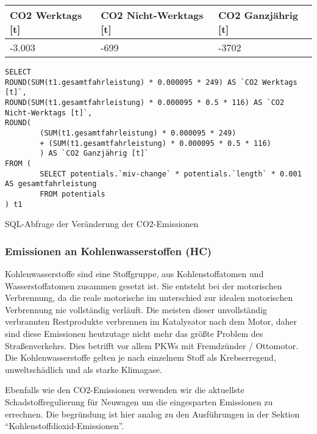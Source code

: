 \documentclass[fontsize=12pt,a4paper]{scrreprt}
\begin{document}
\vspace{1em}

\begin{tabular}{|l|l|l|}
        \hline
        CO2 Werktags [t] & CO2 Nicht-Werktags [t] & CO2 Ganzjährig [t] \\
        \hline
        -3.003           & -699                   & -3702              \\
        \hline
\end{tabular}

\begin{listing}[htbp]
        \begin{verbatim}
SELECT 
ROUND(SUM(t1.gesamtfahrleistung) * 0.000095 * 249) AS `CO2 Werktags [t]`, 
ROUND(SUM(t1.gesamtfahrleistung) * 0.000095 * 0.5 * 116) AS `CO2 Nicht-Werktags [t]`, 
ROUND(
        (SUM(t1.gesamtfahrleistung) * 0.000095 * 249) 
        + (SUM(t1.gesamtfahrleistung) * 0.000095 * 0.5 * 116)
        ) AS `CO2 Ganzjährig [t]`
FROM (
        SELECT potentials.`miv-change` * potentials.`length` * 0.001 AS gesamtfahrleistung
        FROM potentials
) t1
\end{verbatim}
        \caption{SQL-Abfrage der Veränderung der CO2-Emissionen}\label{lst-emmissionen-co2}
\end{listing}

\subsubsection{Emissionen an Kohlenwasserstoffen (HC)}
Kohlenwasserstoffe sind eine Stoffgruppe, aus Kohlenstoffatomen und Wasserstoffatomen zusammen gesetzt ist. Sie entsteht bei der motorischen Verbrennung, da die reale motorische im unterschied zur idealen motorischen Verbrennung nie vollständig verläuft. Die meisten dieser unvollständig verbrannten Restprodukte verbrennen im Katalysator nach dem Motor, daher sind diese Emissionen heutzutage nicht mehr das größte Problem des Straßenverkehrs. Dies betrifft vor allem PKWs mit Fremdzünder / Ottomotor. Die Kohlenwasserstoffe gelten je nach einzelnem Stoff als Krebserregend, unweltschädlich und als starke Klimagase.

\vspace{1em}

Ebenfalls wie den CO2-Emissionen verwenden wir die aktuellste Schadstoffregulierung für Neuwagen um die eingesparten Emissionen zu errechnen. Die begründung ist hier analog zu den Ausführungen in der Sektion \enquote{Kohlenstoffdioxid-Emissionen}.
\end{document}
